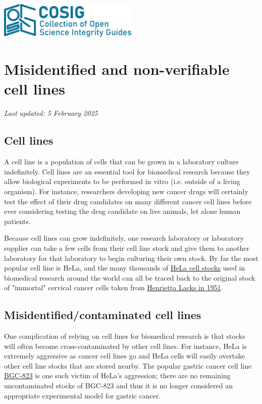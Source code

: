 \documentclass[letterpaper, 12pt]{article}
\begin{document}
\flushleft
\includegraphics[width=0.5\textwidth]{img/home/241017_final_logo_mockup.png}

\section*{Misidentified and non-verifiable cell lines}
\textit{Last updated: 5 February 2025}
\subsection*{Cell lines}

A cell line is a population of cells that can be grown in a laboratory culture indefinitely. Cell lines are an essential tool for biomedical research because they allow biological experiments to be performed in vitro (i.e. outside of a living organism). For instance, researchers developing new cancer drugs will certainly test the effect of their drug candidates on many different cancer cell lines before ever considering testing the drug candidate on live animals, let alone human patients.

Because cell lines can grow indefinitely, one research laboratory or laboratory supplier can take a few cells from their cell line stock and give them to another laboratory for that laboratory to begin culturing their own stock. By far the most popular cell line is HeLa, and the many thousands of \href{https://www.cellosaurus.org/CVCL_0030}{HeLa cell stocks} used in biomedical research around the world can all be traced back to the original stock of "immortal" cervical cancer cells taken from \href{https://en.wikipedia.org/wiki/Henrietta_Lacks}{Henrietta Lacks in 1951}.

\subsection*{Misidentified/contaminated cell lines}

One complication of relying on cell lines for biomedical research is that stocks will often become cross-contaminated by other cell lines. For instance, HeLa is extremely aggressive as cancer cell lines go and HeLa cells will easily overtake other cell line stocks that are stored nearby. The popular gastric cancer cell line \href{https://www.cellosaurus.org/CVCL_3360}{BGC-823} is one such victim of HeLa’s aggression; there are no remaining uncontaminated stocks of BGC-823 and thus it is no longer considered an appropriate experimental model for gastric cancer.
\end{document}
